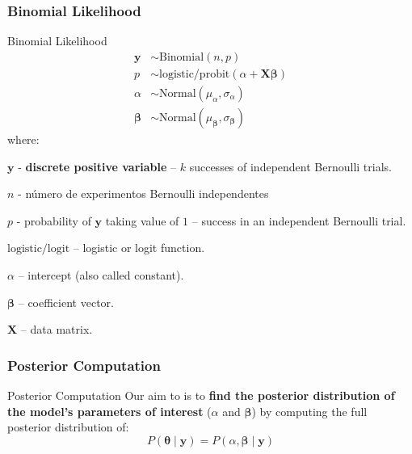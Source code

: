 \subsubsection{Binomial Likelihood}
\begin{frame}{Binomial Likelihood}
	\small
	$$
		\begin{aligned}
			\boldsymbol{y}     & \sim \text{Binomial}\left(n,  p\right)                                    \\
			p                  & \sim \text{logistic/probit}(\alpha +  \mathbf{X} \boldsymbol{\beta})      \\
			\alpha             & \sim \text{Normal}(\mu_\alpha, \sigma_\alpha)                             \\
			\boldsymbol{\beta} & \sim \text{Normal}(\mu_{\boldsymbol{\beta}}, \sigma_{\boldsymbol{\beta}})
		\end{aligned}
	$$
	where:
	\begin{vfilleditems}
		\item \small $\boldsymbol{y}$ - \textbf{discrete positive variable} -- $k$ successes of independent Bernoulli trials.
		\item \small $n$ - número de experimentos Bernoulli independentes
		\item \small $p$ - probability of $\boldsymbol{y}$ taking value of $1$ --
		success in an independent Bernoulli trial.
		\item \small $\text{logistic/logit}$ -- logistic or logit function.
		\item \small $\alpha$ -- intercept (also called constant).
		\item \small $\boldsymbol{\beta}$ -- coefficient vector.
		\item \small $\mathbf{X}$ -- data matrix.
	\end{vfilleditems}
\end{frame}

\subsubsection{Posterior Computation}
\begin{frame}{Posterior Computation}
	Our aim to is to \textbf{find the posterior distribution of the
		model's parameters of interest} ($\alpha$ and $\boldsymbol{\beta}$)
	by computing the full posterior distribution of:
	$$
		P(\boldsymbol{\theta} \mid \boldsymbol{y}) = P(\alpha, \boldsymbol{\beta} \mid \boldsymbol{y})
	$$
\end{frame}

